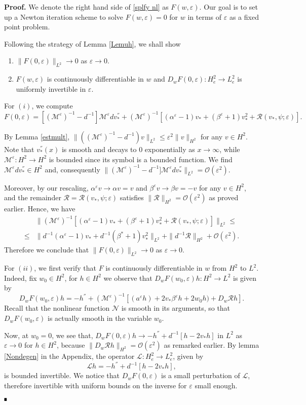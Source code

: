 \documentclass[letterpaper,11pt]{article}
\newcommand{\rmO}{\mathcal{O}}
\newcommand{\eps}{\varepsilon}
\newcommand{\Rm}{\mathcal{R}}
\newcommand{\Nl}{\mathcal{N}}
\newcommand{\M}{\mathcal{M}}
\newcommand{\cL}{\mathcal{L}}
\numberwithin{equation}{section}
\theoremstyle{plain}
\theoremstyle{remark}
\newenvironment{Proof}[1][.]%
 {\begin{trivlist}\item[]\textbf{Proof#1 }}%
 {\hspace*{\fill}$\rule{0.3\baselineskip}{0.35\baselineskip}$\end{trivlist}}
\begin{document}
\begin{Proof}
We denote the right hand side of \eqref{splfy nl} as $ F(w,\eps)$. Our goal is to set up a Newton iteration scheme to solve $ F(w,\eps) =0$ for $w$ in terms of $\eps$ as a fixed point problem.

Following the strategy of Lemma \ref{Lemuh}, we shall show
\begin{enumerate}
\item $\|F(0,\eps)\|_{L^2} \to 0$ as $\eps \to 0$.
\item $F(w,\eps)$ is continuously differentiable in $w$ and $D_wF(0,\eps): H^2_{e} \to L^{2}_{e}$ is uniformly invertible in $\eps$.
\end{enumerate}
For $(i)$, we compute
\[
F(0,\eps) = [(\M^{\eps})^{-1}-d^{-1}]\M^\eps dv_*^{''}+(\M^\eps)^{-1}[(\alpha^\eps-1)v_*+(\beta^\eps+1)v_*^2+\Rm(v_*,\psi;\eps)].
\]

By Lemma \ref{estmult}, $\|\left((\M^\eps)^{-1} - d^{-1}\right)v\|_{L^2} \le \eps^2\|v\|_{H^2}$ for any $v\in H^2$. Note that $v_*^{''}(x)$ is smooth and decays to $0$ exponentially as $x\to \infty$, while $\M^\eps : H^2 \to H^2$ is bounded since its symbol is a bounded function. We find $\M^\eps dv_*^{''} \in H^2$ and, consequently $\|(\M^{\eps})^{-1}-d^{-1}]\M^\eps dv_*^{''}\|_{L^2} = \rmO(\eps^2)$.

Moreover, by our rescaling, $\alpha^\eps v \to \alpha v= v$ and $\beta^\eps v\to \beta v=-v$ for any $v \in H^2$, and the remainder $\Rm=\Rm(v_*,\psi;\eps)$ satisfies $\|\Rm\|_{H^2} = \rmO(\eps^2)$ as proved earlier. Hence, we have 
\begin{align*}
&\|(\M^\eps)^{-1}[(\alpha^\eps-1)v_*+(\beta^\eps+1)v_*^2+\Rm(v_*,\psi;\eps)]\|_{L^2} \le \\
\le & \|d^{-1}(\alpha^\eps-1)v_*+d^{-1}(\beta^*+1)v_*^2\|_{L^2} + \|d^{-1} \Rm\|_{H^2} + \rmO(\eps^2).
\end{align*}
Therefore we conclude that $\|F(0,\eps)\|_{L^2} \to 0$ as $\eps \to 0$.

For $(ii)$, we first verify that $F$ is continuously differentiable in $w$ from $H^2$ to $L^2$. Indeed, fix $w_0\in H^2$, for $h \in H^2$ we observe that $D_wF(w_0,\eps)h:H^2 \to L^2$ is given by
\[
D_wF(w_0,\eps)h = -h^{''}+(\M^\eps)^{-1}\left[(a^\eps h)+2v_*\beta^\eps h + 2w_0h)+D_w\Rm h\right].
\]
Recall that the nonlinear function $\Nl$ is smooth in its arguments, so  that$D_wF(w_0,\eps)$ is actually smooth in the variable $w_0$.

Now, at $w_0 = 0$, we see that, $D_wF(0,\eps)h \to -h^{''}+d^{-1}[h-2v_*h]$ in $L^2$ as $\eps \to 0$ for $h \in H^2$, because $\|D_w\Rm h\|_{H^2} = \rmO(\eps^2)$ as remarked earlier. By lemma \ref{Nondegen} in the Appendix, the operator $\cL : H^2_e \to L^2_e$, given by 
\[
\cL h = -h^{''}+d^{-1}[h-2v_*h],
\] is bounded invertible. We notice that $D_wF(0,\eps)$ is a small perturbation of $\cL$, therefore invertible with uniform bounds on the inverse for $\eps$ small enough.


\end{Proof}
\end{document}
